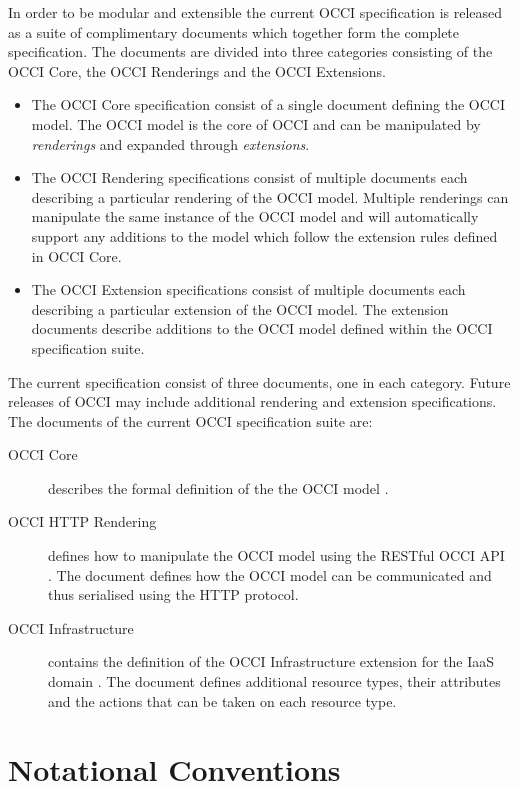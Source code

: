 \documentclass[10pt,a4paper,british]{article}
\begin{document}
In order to be modular and extensible the current OCCI specification is
released as a suite of complimentary documents which together form the complete
specification.
%
The documents are divided into three categories consisting of the OCCI Core,
the OCCI Renderings and the OCCI Extensions.
%
\begin{itemize}
\item The OCCI Core specification consist of a single document defining the
 OCCI model. The OCCI model is the core of OCCI and can be manipulated by {\em
 renderings} and expanded through {\em extensions}.
\item The OCCI Rendering specifications consist of multiple documents each
 describing a particular rendering of the OCCI model. Multiple renderings can
 manipulate the same instance of the OCCI model and will automatically support
 any additions to the model which follow the extension rules defined in OCCI
 Core.
\item The OCCI Extension specifications consist of multiple documents each
 describing a particular extension of the OCCI model. The extension documents
 describe additions to the OCCI model defined within the OCCI specification
 suite.
\end{itemize}
%
The current specification consist of three documents, one in each category.
Future releases of OCCI may include additional rendering and extension
specifications. The documents of the current OCCI specification suite are:

\begin{description}
\item[OCCI Core] describes the formal definition of the the OCCI model
\cite{occi:core}.
\item[OCCI HTTP Rendering] defines how to manipulate the OCCI model using the
RESTful OCCI API \cite{occi:http}. The document defines how the OCCI model can
be communicated and thus serialised using the HTTP protocol.
\item[OCCI Infrastructure] contains the definition of the OCCI Infrastructure
extension for the IaaS domain \cite{occi:infrastructure}. The document defines
additional resource types, their attributes and the actions that can be taken
on each resource type.
\end{description}


\section{Notational Conventions}

\end{document}
